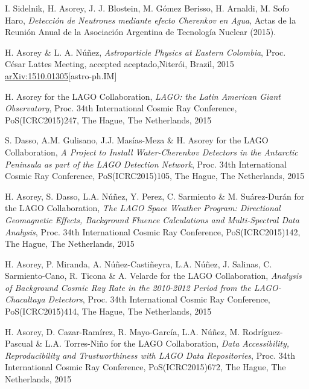 \begin{etaremune}
\item {} I. Sidelnik, H. Asorey, J. J. Blostein, M. Gómez Berisso, H. Arnaldi, M. Sofo Haro, {\emph{Detección de Neutrones mediante efecto Cherenkov en Agua}}, Actas de la Reunión Anual de la Asociación Argentina de Tecnología Nuclear (2015).

\item {}H. Asorey \& L. A. Núñez, {\emph{Astroparticle Physics at Eastern Colombia}}, \en Proc. César Lattes Meeting, \ifeng accepted \else aceptado,\fi Niterói, Brazil, 2015 \href{http://arxiv.org/abs/1510.01305}{arXiv:1510.01305}[astro-ph.IM]

\item {}H. Asorey for the LAGO Collaboration, {\emph{LAGO: the Latin American Giant Observatory}}, \en Proc. 34th International Cosmic Ray Conference, PoS(ICRC2015)247, The Hague, The Netherlands, 2015

\item {}S. Dasso, A.M. Gulisano, J.J. Masías-Meza \& H. Asorey for the LAGO Collaboration, {\emph{A Project to Install Water-Cherenkov Detectors in the Antarctic Peninsula as part of the LAGO Detection Network}}, \en Proc. 34th International Cosmic Ray Conference, PoS(ICRC2015)105, The Hague, The Netherlands, 2015

\item {}H. Asorey, S. Dasso, L.A. Núñez, Y. Perez, C. Sarmiento \& M. Suárez-Durán for the LAGO Collaboration, {\emph{The LAGO Space Weather Program: Directional Geomagnetic Effects, Background Fluence Calculations and Multi-Spectral Data Analysis}}, \en Proc. 34th International Cosmic Ray Conference, PoS(ICRC2015)142, The Hague, The Netherlands, 2015

\item {}H. Asorey, P. Miranda, A. Núñez-Castiñeyra, L.A. Núñez, J. Salinas, C. Sarmiento-Cano, R. Ticona \& A. Velarde for the LAGO Collaboration, {\emph{Analysis of Background Cosmic Ray Rate in the 2010-2012 Period from the LAGO-Chacaltaya Detectors}}, \en Proc. 34th International Cosmic Ray Conference, PoS(ICRC2015)414, The Hague, The Netherlands, 2015

\item {}H. Asorey, D. Cazar-Ramírez, R. Mayo-García, L.A. Núñez, M. Rodríguez-Pascual \& L.A. Torres-Niño for the LAGO Collaboration, {\emph{Data Accessibility, Reproducibility and Trustworthiness with LAGO Data Repositories}}, \en Proc. 34th International Cosmic Ray Conference, PoS(ICRC2015)672, The Hague, The Netherlands, 2015


\end{etaremune}
